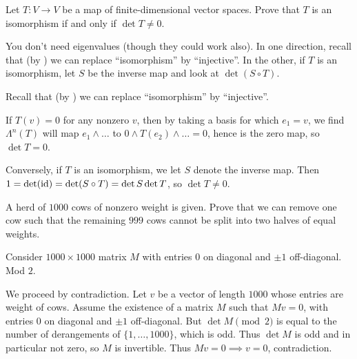 \begin{problem}
	Let $T \colon V \to V$ be a map of finite-dimensional vector spaces.
	Prove that $T$ is an isomorphism
	if and only if $\det T \ne 0$.
	\begin{hint}
		You don't need eigenvalues (though they could work also).
		In one direction, recall that (by )
		we can replace ``isomorphism'' by ``injective''.
		In the other, if $T$ is an isomorphism,
		let $S$ be the inverse map and look at $\det(S \circ T)$.
	\end{hint}
	\begin{sol}
		Recall that (by \Cref{prob:equal_dimension})
		we can replace ``isomorphism'' by ``injective''.

		If $T(v) = 0$ for any nonzero $v$,
		then by taking a basis for which $e_1 = v$,
		we find $\Lambda^n(T)$ will map $e_1 \wedge \dots$
		to $0 \wedge T(e_2) \wedge \dots = 0$,
		hence is the zero map, so $\det T = 0$.

		Conversely, if $T$ is an isomorphism,
		we let $S$ denote the inverse map.
		Then $1 = \det(\mathrm{id}) = \det(S \circ T) = \det S \det T$,
		so $\det T \ne 0$.
	\end{sol}
\end{problem}

\begin{problem}
	\gim
	A herd of $1000$ cows of nonzero weight is given.
	Prove that we can remove one cow such that the
	remaining $999$ cows cannot be split
	into two halves of equal weights.
	\begin{hint}
		Consider $1000 \times 1000$ matrix $M$
		with entries $0$ on diagonal and $\pm 1$ off-diagonal.
		Mod $2$.
	\end{hint}
	\begin{sol}
		We proceed by contradiction.
		Let $v$ be a vector of length $1000$
		whose entries are weight of cows.
		Assume the existence of a matrix $M$ such that $Mv = 0$,
		with entries $0$ on diagonal and $\pm 1$ off-diagonal.
		But $\det M \pmod 2$ is equal to the number of derangements
		of $\{1, \dots, 1000\}$, which is odd.
		Thus $\det M$ is odd and in particular not zero,
		so $M$ is invertible.
		Thus $Mv = 0 \implies v = 0$, contradiction.
	\end{sol}
\end{problem}

